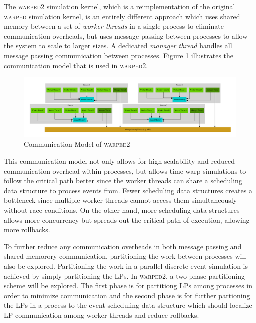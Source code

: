 \documentclass[11pt]{book}
\begin{document}
The \textsc{warped2} simulation kernel, which is a reimplementation of the original
\textsc{warped} simulation kernel, is an entirely different approach which uses shared
memory between a set of \emph{worker threads} in a single process to eliminate communication
overheads, but uses message passing between processes to allow the system to scale to larger
sizes. A dedicated \emph{manager thread} handles all message passing communication between
processes. Figure \ref{warped2_communication} illustrates the communication model that is
used in \textsc{warped2}.

\begin{figure}[H]
    \centering
    \includegraphics[width=\textwidth]{figs/graphviz/warped_communication.pdf}
    \caption{Communication Model of \textsc{warped2}}\label{warped2_communication}
\end{figure}

\noindent
This communication model not only allows for high scalability and reduced communication
overhead within processes, but allows time warp simulations to follow the critical path better
since the worker threads can share a scheduling data structure to process events from.
Fewer scheduling data structures creates a bottleneck since multiple worker threads cannot
access them simultaneously without race conditions. On the other hand, more scheduling
data structures allows more concurrency but spreads out the critical path of execution,
allowing more rollbacks.

To further reduce any communication overheads in both message passing and shared memorory
communication, partitioning the work between processes will also be explored. Partitioning
the work in a parallel discrete event simulation is achieved by simply partitioning the
LPs. In \textsc{warped2}, a two phase partitioning scheme will be explored. The first phase
is for partitiong LPs among processes in order to minimize communication and the second
phase is for further partioning the LPs in a process to the event scheduling data structure
which should localize LP communication among worker threads and reduce rollbacks.
\end{document}
